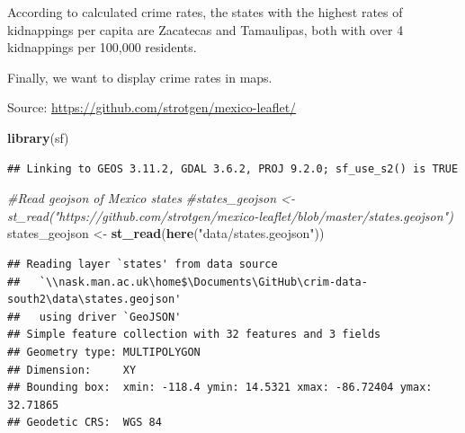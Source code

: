 \documentclass[
]{article}
\newenvironment{Shaded}{\begin{snugshade}}{\end{snugshade}}
\newcommand{\CommentTok}[1]{\textcolor[rgb]{0.56,0.35,0.01}{\textit{#1}}}
\newcommand{\FunctionTok}[1]{\textcolor[rgb]{0.13,0.29,0.53}{\textbf{#1}}}
\newcommand{\NormalTok}[1]{#1}
\newcommand{\OtherTok}[1]{\textcolor[rgb]{0.56,0.35,0.01}{#1}}
\newcommand{\StringTok}[1]{\textcolor[rgb]{0.31,0.60,0.02}{#1}}
\begin{document}
According to calculated crime rates, the states with the highest rates
of kidnappings per capita are Zacatecas and Tamaulipas, both with over 4
kidnappings per 100,000 residents.

Finally, we want to display crime rates in maps.

Source: \url{https://github.com/strotgen/mexico-leaflet/}

\begin{Shaded}
\begin{Highlighting}[]
\FunctionTok{library}\NormalTok{(sf)}
\end{Highlighting}
\end{Shaded}

\begin{verbatim}
## Linking to GEOS 3.11.2, GDAL 3.6.2, PROJ 9.2.0; sf_use_s2() is TRUE
\end{verbatim}

\begin{Shaded}
\begin{Highlighting}[]
\CommentTok{\#Read geojson of Mexico states}
\CommentTok{\#states\_geojson \textless{}{-} st\_read("https://github.com/strotgen/mexico{-}leaflet/blob/master/states.geojson")}
\NormalTok{states\_geojson }\OtherTok{\textless{}{-}} \FunctionTok{st\_read}\NormalTok{(}\FunctionTok{here}\NormalTok{(}\StringTok{"data/states.geojson"}\NormalTok{))}
\end{Highlighting}
\end{Shaded}

\begin{verbatim}
## Reading layer `states' from data source 
##   `\\nask.man.ac.uk\home$\Documents\GitHub\crim-data-south2\data\states.geojson' 
##   using driver `GeoJSON'
## Simple feature collection with 32 features and 3 fields
## Geometry type: MULTIPOLYGON
## Dimension:     XY
## Bounding box:  xmin: -118.4 ymin: 14.5321 xmax: -86.72404 ymax: 32.71865
## Geodetic CRS:  WGS 84
\end{verbatim}
\end{document}
